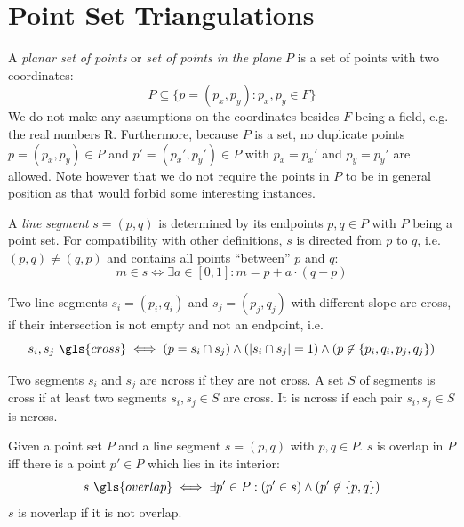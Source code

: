 \section{Point Set Triangulations}


\begin{definition}
  A \emph{planar set of points} or \emph{set of points in the plane}
  \(P\) is a set of points with two coordinates:
  \[ P \subseteq \{p = (p_x,p_y) : p_x,p_y \in F\} \]
  We do not make any assumptions on the coordinates besides \(F\)
  being a field, e.g. the real numbers \gls{R}. Furthermore,
  because \(P\) is a set, no duplicate points \(p=(p_x,p_y)\in P\) and
  \(p'=(p_x',p_y')\in P\) with \(p_x=p_x'\) and \(p_y=p_y'\) are allowed.
  Note however that we do not require the points in \(P\) to be in 
  general position as that would forbid some interesting instances.
\end{definition}


\begin{definition}
  A \emph{line segment} \(s=(p,q)\) is determined by its endpoints
  \(p,q\in P\) with \(P\) being a point set. For compatibility
  with other definitions, \(s\) is directed from \(p\) to \(q\), i.e.
  \((p,q)\not=(q,p)\) and contains all points ``between'' \(p\) and
  \(q\):
  \[ m \in s \iff \exists a\in [0,1] : m = p + a \cdot (q-p) \]
\end{definition}


\begin{definition}[Crossing]\label{def:crossing}
  Two line segments \(s_i=(p_i,q_i)\) and \(s_j=(p_j,q_j)\) with 
  different slope are \gls{cross}, if their intersection is not empty
  and not an endpoint, i.e.
  \[
    s_i, s_j~\gls{cross}
    \iff
    (p = s_i\cap s_j) \land
    (|s_i\cap s_j| = 1) \land
    (p \not\in \{p_i,q_i,p_j,q_j\})
  \]

  Two segments \(s_i\) and \(s_j\) are \gls{ncross} if they are
  not \gls{cross}. A set \(S\) of segments is \gls{cross} if at least
  two segments \(s_i, s_j \in S\) are \gls{cross}. It is \gls{ncross}
  if each pair \(s_i, s_j \in S\) is \gls{ncross}.
\end{definition}


\begin{definition}
  \label{def:overlapping_segments}
  Given a point set \(P\) and a line segment \(s = (p,q)\) with
  \(p,q \in P\). \(s\) is \gls{overlap} in \(P\) iff there is a point
  \(p' \in P\) which lies in its interior:
  \[
    s~\gls{overlap}
    \iff  \exists p' \in P : (p' \in s) \land (p' \not\in \{p,q\})
  \]
  \(s\) is \gls{noverlap} if it is not \gls{overlap}.
\end{definition}

